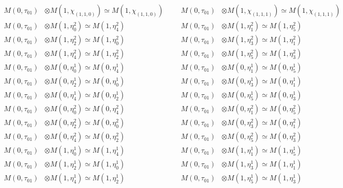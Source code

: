 \begin{align*}
M(0,\tau_{01}) &\otimes M(1,\chi_{(1,1,0)}) \simeq M(1,\chi_{(1,1,0)}) &&& M(0,\tau_{01}) &\otimes M(1,\chi_{(1,1,1)}) \simeq M(1,\chi_{(1,1,1)})\\
M(0,\tau_{01}) &\otimes M(1,\eta^{2}_{0}) \simeq M(1,\eta^{2}_{4}) &&& M(0,\tau_{01}) &\otimes M(1,\eta^{2}_{1}) \simeq M(1,\eta^{2}_{5})\\
M(0,\tau_{01}) &\otimes M(1,\eta^{2}_{2}) \simeq M(1,\eta^{2}_{0}) &&& M(0,\tau_{01}) &\otimes M(1,\eta^{2}_{3}) \simeq M(1,\eta^{2}_{1})\\
M(0,\tau_{01}) &\otimes M(1,\eta^{2}_{4}) \simeq M(1,\eta^{2}_{2}) &&& M(0,\tau_{01}) &\otimes M(1,\eta^{2}_{5}) \simeq M(1,\eta^{2}_{3})\\
M(0,\tau_{01}) &\otimes M(0,\eta^{1}_{0}) \simeq M(0,\eta^{1}_{4}) &&& M(0,\tau_{01}) &\otimes M(0,\eta^{1}_{1}) \simeq M(0,\eta^{1}_{5})\\
M(0,\tau_{01}) &\otimes M(0,\eta^{1}_{2}) \simeq M(0,\eta^{1}_{0}) &&& M(0,\tau_{01}) &\otimes M(0,\eta^{1}_{3}) \simeq M(0,\eta^{1}_{1})\\
M(0,\tau_{01}) &\otimes M(0,\eta^{1}_{4}) \simeq M(0,\eta^{1}_{2}) &&& M(0,\tau_{01}) &\otimes M(0,\eta^{1}_{5}) \simeq M(0,\eta^{1}_{3})\\
M(0,\tau_{01}) &\otimes M(0,\eta^{2}_{0}) \simeq M(0,\eta^{2}_{4}) &&& M(0,\tau_{01}) &\otimes M(0,\eta^{2}_{1}) \simeq M(0,\eta^{2}_{5})\\
M(0,\tau_{01}) &\otimes M(0,\eta^{2}_{2}) \simeq M(0,\eta^{2}_{0}) &&& M(0,\tau_{01}) &\otimes M(0,\eta^{2}_{3}) \simeq M(0,\eta^{2}_{1})\\
M(0,\tau_{01}) &\otimes M(0,\eta^{2}_{4}) \simeq M(0,\eta^{2}_{2}) &&& M(0,\tau_{01}) &\otimes M(0,\eta^{2}_{5}) \simeq M(0,\eta^{2}_{3})\\
M(0,\tau_{01}) &\otimes M(1,\eta^{1}_{0}) \simeq M(1,\eta^{1}_{4}) &&& M(0,\tau_{01}) &\otimes M(1,\eta^{1}_{1}) \simeq M(1,\eta^{1}_{5})\\
M(0,\tau_{01}) &\otimes M(1,\eta^{1}_{2}) \simeq M(1,\eta^{1}_{0}) &&& M(0,\tau_{01}) &\otimes M(1,\eta^{1}_{3}) \simeq M(1,\eta^{1}_{1})\\
M(0,\tau_{01}) &\otimes M(1,\eta^{1}_{4}) \simeq M(1,\eta^{1}_{2}) &&& M(0,\tau_{01}) &\otimes M(1,\eta^{1}_{5}) \simeq M(1,\eta^{1}_{3})\\
\end{align*}


